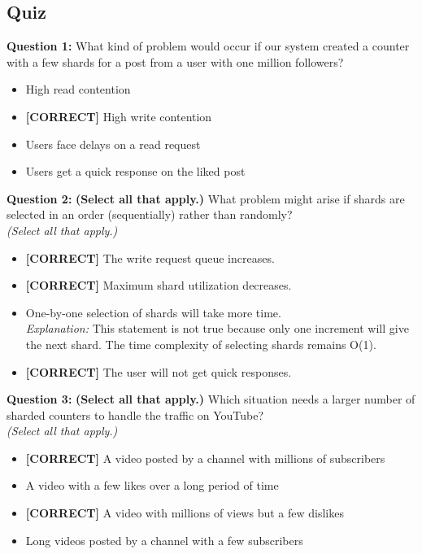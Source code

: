 



\subsection*{Quiz}
\vspace{0.3cm}
\noindent
\textbf{Question 1:} What kind of problem would occur if our system created a counter with a few shards for a post from a user with one million followers?
\\[0.2cm]
\begin{itemize}
 \item High read contention
 \item \textbf{[CORRECT]} High write contention
 \item Users face delays on a read request
 \item Users get a quick response on the liked post
\end{itemize}
\vspace{0.3cm}
\noindent
\textbf{Question 2:} \textbf{(Select all that apply.)} What problem might arise if shards are selected in an order (sequentially) rather than randomly?
\\
\textit{(Select all that apply.)}
\\[0.2cm]
\begin{itemize}
 \item \textbf{[CORRECT]} The write request queue increases.
 \item \textbf{[CORRECT]} Maximum shard utilization decreases.
 \item One-by-one selection of shards will take more time.
\\[0.1cm]
\textit{Explanation:} 
This statement is not true because only one increment will give the next shard. The time complexity of selecting shards remains O(1).
 \item \textbf{[CORRECT]} The user will not get quick responses.
\end{itemize}
\vspace{0.3cm}
\noindent
\textbf{Question 3:} \textbf{(Select all that apply.)} Which situation needs a larger number of sharded counters to handle the traffic on YouTube?
\\
\textit{(Select all that apply.)}
\\[0.2cm]
\begin{itemize}
 \item \textbf{[CORRECT]} A video posted by a channel with millions of subscribers
 \item A video with a few likes over a long period of time
 \item \textbf{[CORRECT]} A video with millions of views but a few dislikes
 \item Long videos posted by a channel with a few subscribers
\end{itemize}


